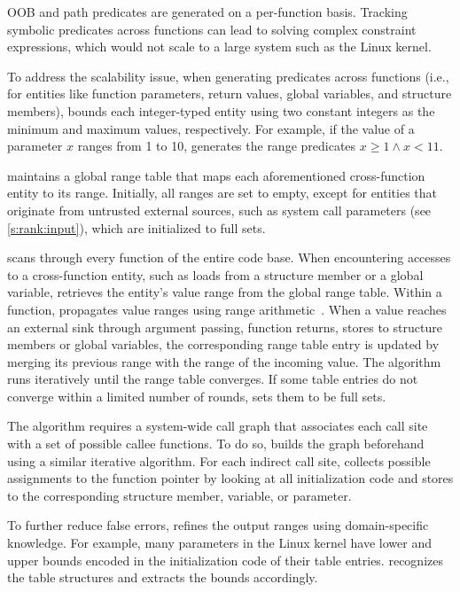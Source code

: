 OOB and path predicates are generated on a per-function basis.
Tracking symbolic predicates across functions can lead to solving complex
constraint expressions, which would not scale to a large system such as the
Linux kernel.

To address the scalability issue, when generating predicates across functions
(i.e., for entities like function parameters, return values, global variables,
and structure members), \sys bounds each integer-typed entity using two constant
integers as the minimum and maximum values, respectively. For example, if the
value of a parameter $x$ ranges from 1 to 10, \sys generates the range
predicates $x \geq 1 \land x < 11$.

\sys maintains a global range table that maps each aforementioned
cross-function entity to its range. Initially, all ranges are set to empty,
except for entities that originate from untrusted external sources, such as
system call parameters (see \autoref{s:rank:input}), which are initialized to
full sets.

\sys scans through every function of the entire code base. When encountering
accesses to a cross-function entity, such as loads from a structure member or a
global variable, \sys retrieves the entity's value range from the global range
table.  Within a function, \sys propagates value ranges using range
arithmetic~\cite{range-analysis}.  When a value reaches an external sink
through argument passing, function returns, stores to structure members or
global variables, the corresponding range table entry is updated by merging its
previous range with the range of the incoming value. The algorithm runs
iteratively until the range table converges.  If some table entries do not
converge within a limited number of rounds, \sys sets them to be full sets.

The algorithm requires a system-wide call graph that associates each call
site with a set of possible callee functions.  To do so, \sys builds
the graph beforehand using a similar iterative algorithm. For each
indirect call site, \sys collects possible assignments to the
function pointer by looking at all initialization code and stores
to the corresponding structure member, variable, or parameter.

To further reduce false errors, \sys refines the output ranges using
domain-specific knowledge. For example, many  parameters in the
Linux kernel have lower and upper bounds encoded in the initialization code of
their  table entries.  \sys recognizes the  table
structures and extracts the bounds accordingly.


